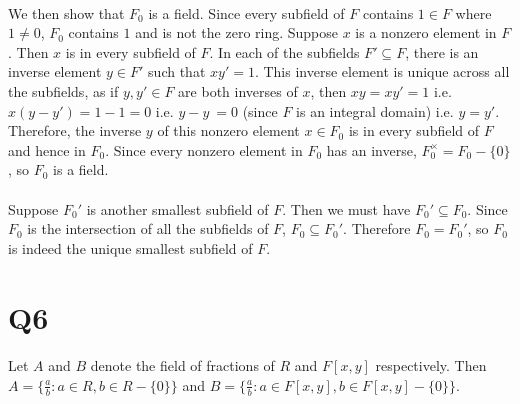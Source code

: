 \documentclass[]{article}
\begin{document}
	\paragraph{}
	We then show that $F_0$ is a field.\newline
	Since every subfield of $F$ contains $1 \in F$ where $1 \not= 0$, $F_0$ contains $1$ and is not the zero ring.\newline
	Suppose $x$ is a nonzero element in $F$. Then $x$ is in every subfield of $F$. In each of the subfields $F' \subseteq F$, there is an inverse element $y \in F'$ such that $xy' = 1$.\newline
	This inverse element is unique across all the subfields, as if $y, y' \in F$ are both inverses of $x$, then $xy = xy' = 1$ i.e. $x(y - y') = 1 - 1 = 0$ i.e. $y - y\ = 0$ (since $F$ is an integral domain) i.e. $y = y'$.\newline
	Therefore, the inverse $y$ of this nonzero element $x \in F_0$ is in every subfield of $F$ and hence in $F_0$.\newline
	Since every nonzero element in $F_0$ has an inverse, $F_0^\times = F_0 - \{0\}$, so $F_0$ is a field.
	
	\paragraph{}
	Suppose $F_0'$ is another smallest subfield of $F$.\newline
	Then we must have $F_0' \subseteq F_0$.
	Since $F_0$ is the intersection of all the subfields of $F$, $F_0 \subseteq F_0'$.\newline
	Therefore $F_0 = F_0'$, so $F_0$ is indeed the unique smallest subfield of $F$.


\section*{Q6}
	\paragraph{}
	Let $A$ and $B$ denote the field of fractions of $R$ and $F[x,y]$ respectively.\newline
	Then $A = \{\frac{a}{b} : a \in R, b \in R - \{0\} \}$ and $B = \{\frac{a}{b} : a \in F[x,y], b \in F[x,y] - \{0\} \}$.\newline
	
\end{document}
